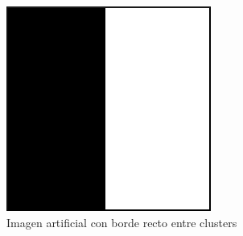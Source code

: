\begin{figure}[h]
\centering
\includegraphics[scale=0.3]{images/mitad_mitad_250x250.png}
\caption{Imagen artificial con borde recto entre clusters}
\label{fig:mitad_mitad}
\end{figure}

